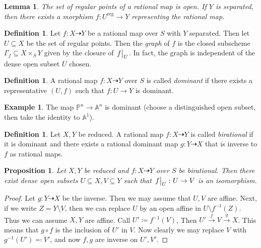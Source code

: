 \documentclass[leqno, openany]{memoir}
\newtheorem{prop}[thm]{Proposition}
\newtheorem{lem}[thm]{Lemma}
\theoremstyle{definition}
\newtheorem{defn}[thm]{Definition}
\newtheorem{exm}[thm]{Example}
\theoremstyle{remark}
\theoremstyle{plain}
\theoremstyle{definition}
\theoremstyle{remark}
\newcommand{\A}{\mathbb{A}}
\renewcommand{\P}{\mathbb{P}}
\newcommand{\mr}[1]{\mathrm{#1}}
\begin{document}
\begin{lem} The set of regular points of a rational map is open. If $Y$ is
separated, then there exists a morphism $f \colon U^{\mr{reg}} \to Y$
representing the rational map.  \end{lem}

\begin{defn} Let $f \colon X \dashrightarrow Y$ be a rational map over $S$ with
    $Y$ separated. Then let $U \subseteq X$ be the set of regular points. Then
    the \textit{graph} of $f$ is the closed subscheme $\Gamma_f \subseteq X
    \times_S Y$ given by the closure of $\eval{f}_U$. In fact, the graph is
    independent of the dense open subset $U$ chosen.  \end{defn}

\begin{defn} A rational map $f \colon X \dashrightarrow Y$ over $S$ is called
\textit{dominant} if there exists a representative $(U, f)$ such that $f \colon
U \to Y$ is dominant.  \end{defn}

\begin{exm} The map $\P^n \to \A^n$ is dominant (choose a distinguished open
subset, then take the identity to $\A^1$).  \end{exm}

\begin{defn} Let $X,Y$ be reduced. A rational map $f \colon X \dashrightarrow
    Y$ is called \textit{birational} if it is dominant and there exists a
    rational dominant map $g \colon Y \dashrightarrow X$ that is inverse to $f$
    as rational maps.  \end{defn}

\begin{prop} Let $X, Y$ be reduced and $f \colon X \dashrightarrow Y$ over $S$
be birational. Then there exist dense open subsets $U \subseteq X, V \subseteq
Y$ such that $\eval{f}_U \colon U \to V$ is an isomorphism.  \end{prop}

\begin{proof} Let $g \colon Y \dashrightarrow X$ be the inverse. Then we may
    assume that $U, V$ are affine. Next, if we write $Z = Y \setminus V$, then
    we can replace $U$ by an open affine in $U \setminus f^{-1}(Z)$. Thus we
    can assume $X,Y$ are affine. Call $U' \coloneqq f^{-1}(V)$, Then $U'
    \xrightarrow{f} V \xrightarrow{g} X$. This means that $g \circ f$ is the
    inclusion of $U'$ in $V$. Now clearly we may replace $V$ with $g^{-1}(U')
    \eqqcolon V'$, and now $f,g$ are inverse on $U', V'$.  \end{proof}
\end{document}
